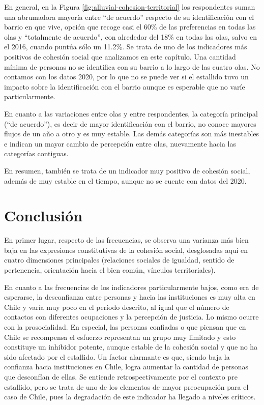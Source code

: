 \documentclass[
  12pt,
]{book}
\begin{document}
En general, en la Figura \ref{fig:alluvial-cohesion-territorial} los respondentes suman una abrumadora mayoría entre ``de acuerdo'' respecto de su identificación con el barrio en que vive, opción que recoge casi el 60\% de las preferencias en todas las olas y ``totalmente de acuerdo'', con alrededor del 18\% en todas las olas, salvo en el 2016, cuando puntúa sólo un 11.2\%. Se trata de uno de los indicadores más positivos de cohesión social que analizamos en este capítulo. Una cantidad mínima de personas no se identifica con su barrio a lo largo de las cuatro olas. No contamos con los datos 2020, por lo que no se puede ver si el estallido tuvo un impacto sobre la identificación con el barrio aunque es esperable que no varíe particularmente.

En cuanto a las variaciones entre olas y entre respondentes, la categoría principal (``de acuerdo''), es decir de mayor identificación con el barrio, no conoce mayores flujos de un año a otro y es muy estable. Las demás categorías son más inestables e indican un mayor cambio de percepción entre olas, nuevamente hacia las categorías contiguas.

En resumen, también se trata de un indicador muy positivo de cohesión social, además de muy estable en el tiempo, aunque no se cuente con datos del 2020.

\hypertarget{conclusiuxf3n}{%
\section{Conclusión}\label{conclusiuxf3n}}

En primer lugar, respecto de las frecuencias, se observa una varianza más bien baja en las expresiones constitutivas de la cohesión social, desglosadas aquí en cuatro dimensiones principales (relaciones sociales de igualdad, sentido de pertenencia, orientación hacia el bien común, vínculos territoriales).

En cuanto a las frecuencias de los indicadores particularmente bajos, como era de esperarse, la desconfianza entre personas y hacia las instituciones es muy alta en Chile y varía muy poco en el período descrito, al igual que el número de contactos con diferentes ocupaciones y la percepción de justicia. Lo mismo ocurre con la prosocialidad. En especial, las personas confiadas o que piensan que en Chile se recompensa el esfuerzo representan un grupo muy limitado y esto constituye un inhibidor potente, aunque estable de la cohesión social y que no ha sido afectado por el estallido. Un factor alarmante es que, siendo baja la confianza hacia instituciones en Chile, logra aumentar la cantidad de personas que desconfían de ellas. Se entiende retrospectivamente por el contexto pre estallido, pero se trata de uno de los elementos de mayor preocupación para el caso de Chile, pues la degradación de este indicador ha llegado a niveles críticos.
\end{document}
